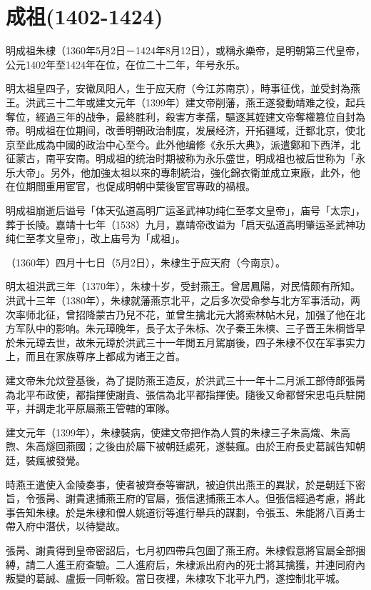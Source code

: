 
\section{成祖\tiny(1402-1424)}

明成祖朱棣（1360年5月2日－1424年8月12日），或稱永樂帝，是明朝第三代皇帝，公元1402年至1424年在位，在位二十二年，年号永乐。

明太祖皇四子，安徽凤阳人，生于应天府（今江苏南京），時事征伐，並受封為燕王。洪武三十二年或建文元年（1399年）建文帝削藩，燕王遂發動靖难之役，起兵奪位，經過三年的战争，最終胜利，殺害方孝孺，驅逐其姪建文帝奪權篡位自封為帝。明成祖在位期间，改善明朝政治制度，发展经济，开拓疆域，迁都北京，使北京至此成為中國的政治中心至今。此外他编修《永乐大典》，派遣鄭和下西洋，北征蒙古，南平安南。明成祖的统治时期被称为永乐盛世，明成祖也被后世称为「永乐大帝」。另外，他加強太祖以來的專制統治，強化錦衣衛並成立東廠，此外，他在位期間重用宦官，也促成明朝中葉後宦官專政的禍根。

明成祖崩逝后谥号「体天弘道高明广运圣武神功纯仁至孝文皇帝」，庙号「太宗」，葬于长陵。嘉靖十七年（1538）九月，嘉靖帝改谥为「启天弘道高明肇运圣武神功纯仁至孝文皇帝」，改上庙号为「成祖」。

（1360年）四月十七日（5月2日），朱棣生于应天府（今南京）。

明太祖洪武三年（1370年），朱棣十岁，受封燕王。曾居鳳陽，对民情颇有所知。洪武十三年（1380年），朱棣就藩燕京北平，之后多次受命参与北方军事活动，两次率师北征，曾招降蒙古乃兒不花，並曾生擒北元大將索林帖木兒，加强了他在北方军队中的影响。朱元璋晚年，長子太子朱标、次子秦王朱樉、三子晋王朱棡皆早於朱元璋去世，故朱元璋於洪武三十一年閒五月駕崩後，四子朱棣不仅在军事实力上，而且在家族尊序上都成为诸王之首。

建文帝朱允炆登基後，為了提防燕王造反，於洪武三十一年十二月派工部侍郎張昺為北平布政使，都指揮使謝貴、張信為北平都指揮使。隨後又命都督宋忠屯兵駐開平，并調走北平原屬燕王管轄的軍隊。

建文元年（1399年），朱棣裝病，使建文帝把作為人質的朱棣三子朱高熾、朱高煦、朱高燧回燕國；之後由於屬下被朝廷處死，遂裝瘋。由於王府長史葛誠告知朝廷，裝瘋被發覺。

時燕王遣使入金陵奏事，使者被齊泰等審訊，被迫供出燕王的異狀，於是朝廷下密旨，令張昺、謝貴逮捕燕王府的官屬，張信逮捕燕王本人。但張信經過考慮，將此事告知朱棣。於是朱棣和僧人姚道衍等進行舉兵的謀劃，令張玉、朱能將八百勇士帶入府中潛伏，以待變故。

張昺、謝貴得到皇帝密詔后，七月初四帶兵包圍了燕王府。朱棣假意將官屬全部捆縛，請二人進王府查驗。二人進府后，朱棣派出府內的死士將其擒獲，并連同府內叛變的葛誠、盧振一同斬殺。當日夜裡，朱棣攻下北平九門，遂控制北平城。

